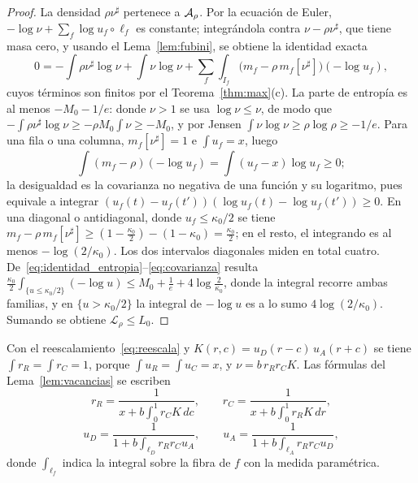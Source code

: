 \begin{proof}
La densidad $\rho\nu^\sharp$ pertenece a ${\mathcal{A}}_\rho$. Por la ecuación de Euler,
$-\log\nu+\sum_f\log u_f\circ\ell_f$ es constante; integrándola contra $\nu-\rho\nu^\sharp$, que tiene
masa cero, y usando el Lema~\ref{lem:fubini}, se obtiene la identidad exacta
\begin{equation}\label{eq:identidad_entropia}
 0=-\int\rho\nu^\sharp\log\nu+\int\nu\log\nu+\sum_f\int_{I_f}\bigl(m_f-\rho\,m_f[\nu^\sharp]\bigr)(-\log u_f),
\end{equation}
cuyos términos son finitos por el Teorema~\ref{thm:max}(c). La parte de entropía es al menos
$-M_0-1/e$: donde $\nu>1$ se usa $\log\nu\le\nu$, de modo que $-\int\rho\nu^\sharp\log\nu\ge-\rho M_0\int\nu\ge-M_0$,
y por Jensen $\int\nu\log\nu\ge\rho\log\rho\ge-1/e$. Para una fila o una columna, $m_f[\nu^\sharp]=1$ e
$\int u_f=x$, luego
\begin{equation}\label{eq:covarianza}
 \int(m_f-\rho)(-\log u_f)=\int(u_f-x)\log u_f\ge0 ;
\end{equation}
la desigualdad es la covarianza no negativa de una función y su logaritmo, pues equivale a integrar
$(u_f(t)-u_f(t'))(\log u_f(t)-\log u_f(t'))\ge0$. En una diagonal o antidiagonal, donde
$u_f\le\kappa_0/2$ se tiene $m_f-\rho\,m_f[\nu^\sharp]\ge(1-\frac{\kappa_0}2)-(1-\kappa_0)=\frac{\kappa_0}2$; en
el resto, el integrando es al menos $-\log(2/\kappa_0)$. Los dos intervalos diagonales miden en total
cuatro. De~\eqref{eq:identidad_entropia}--\eqref{eq:covarianza} resulta
$\frac{\kappa_0}2\int_{\{u\le\kappa_0/2\}}(-\log u)\le M_0+\frac1e+4\log\frac2{\kappa_0}$, donde la
integral recorre ambas familias, y en $\{u>\kappa_0/2\}$ la integral de $-\log u$ es a lo sumo
$4\log(2/\kappa_0)$. Sumando se obtiene $\mathcal L_\rho\le L_0$.
\end{proof}

Con el reescalamiento~\eqref{eq:reescala} y $K(r,c)=u_D(r-c)\,u_A(r+c)$ se tiene
$\int r_R=\int r_C=1$, porque $\int u_R=\int u_C=x$, y $\nu=b\,r_Rr_CK$. Las fórmulas del
Lema~\ref{lem:vacancias} se escriben
\begin{equation}\label{eq:filas}
 r_R=\frac1{x+b\int_0^1r_CK\,dc},\qquad r_C=\frac1{x+b\int_0^1r_RK\,dr},
\end{equation}
\begin{equation}\label{eq:diagonales}
 u_D=\frac1{1+b\int_{\ell_D}r_Rr_Cu_A},\qquad u_A=\frac1{1+b\int_{\ell_A}r_Rr_Cu_D},
\end{equation}
donde $\int_{\ell_f}$ indica la integral sobre la fibra de $f$ con la medida paramétrica.

